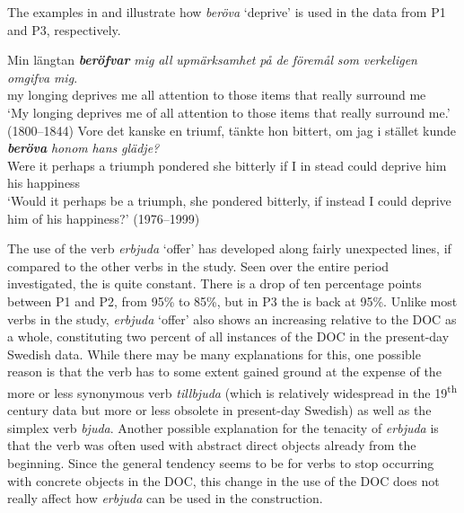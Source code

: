 \documentclass[output=paper]{langscibook}
\begin{document}
The examples in  and  illustrate how \textit{beröva} ‘deprive’ is used in the data from P1 and P3, respectively.


\ea \label{ex:valdeson:20}
\gll Min längtan \textbf{\textit{beröfvar}} \textit{mig}   \textit{all}     \textit{upmärksamhet} \textit{på}   \textit{de}   \textit{föremål} \textit{som}   \textit{verkeligen}  \textit{omgifva}     \textit{mig}.\\
  my   longing deprives   me   all   attention       to     those   items that   really       surround   me\\
\glt ‘My longing deprives me of all attention to those items that really surround me.’ (1800–1844)
\ex \label{ex:valdeson:21}
\gll Vore  det  kanske  en  triumf,    tänkte    hon    bittert, om  jag  i   stället   kunde \textit{\textbf{beröva} }\textit{honom}    \textit{hans}  \textit{glädje?}\\
  Were   it perhaps  a  triumph  pondered  she     bitterly if    I        in   stead    could   deprive  him        his    happiness\\
\glt ‘Would it perhaps be a triumph, she pondered bitterly, if instead I could deprive him of his happiness?’ (1976–1999)
\z


\label{sec:valdeson:5.3.3.2}



The use of the verb \textit{erbjuda} ‘offer’ has developed along fairly unexpected lines, if compared to the other verbs in the study. Seen over the entire period investigated, the  is quite constant. There is a drop of ten percentage points between P1 and P2, from 95\% to 85\%, but in P3 the  is back at 95\%. Unlike most verbs in the study, \textit{erbjuda} ‘offer’ also shows an increasing  relative to the DOC as a whole, constituting two percent of all instances of the DOC in the present-day Swedish data. While there may be many explanations for this, one possible reason is that the verb has to some extent gained ground at the expense of the more or less synonymous verb \textit{tillbjuda} (which is relatively widespread in the 19\textsuperscript{th} century data but more or less obsolete in present-day Swedish) as well as the simplex verb \textit{bjuda}. Another possible explanation for the tenacity of \textit{erbjuda} is that the verb was often used with abstract direct objects already from the beginning. Since the general tendency seems to be for verbs to stop occurring with concrete objects in the DOC, this change in the use of the DOC does not really affect how \textit{erbjuda} can be used in the construction.
\end{document}
